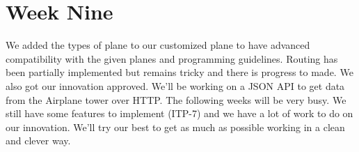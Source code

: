 \documentclass{article}
\begin{document}
\section{Week Nine}

We added the types of plane to our customized plane to have advanced compatibility with the given planes and programming guidelines. Routing has been partially implemented but remains tricky and there is progress to made. We also got our innovation approved. We'll be working on a JSON API to get data from the Airplane tower over HTTP. The following weeks will be very busy. We still have some features to implement (ITP-7) and we have a lot of work to do on our innovation. We'll try our best to get as much as possible working in a clean and clever way.
\end{document}
